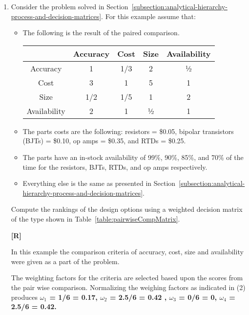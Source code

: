 \begin{enumerate}
\item
  Consider the problem solved in 
  Section~\ref{subsection:analytical-hierarchy-process-and-decision-matrices}. 
  For this example assume   that:
\begin{itemize}

\item
  The following is the result of the paired comparison.

\begin{table}
\begin{tabular}{|c|c|c|c|c|}
\hline
              &
Accuracy &
Cost &
Size &
Availability \\ \hline
Accuracy & 1 & 1/3 & 2 & ½ \\ \hline
Cost & 3 & 1 & 5 & 1 \\ \hline
Size & 1/2 & 1/5 & 1 & 2 \\ \hline
Availability & 2 & 1 & ½ & 1 \\ \hline
\end{tabular}
\end{table}


\item
  The parts costs are the following: resistors = \$0.05, bipolar
  transistors (BJTs) = \$0.10, op amps = \$0.35, and RTDs = \$0.25.
\item
  The parts have an in-stock availability of 99\%, 90\%, 85\%, and 70\%
  of the time for the re­sistors, BJTs, RTDs, and op amps respectively.
\item
  Everything else is the same as presented in 
  Section~\ref{subsection:analytical-hierarchy-process-and-decision-matrices}.
\end{itemize}

Compute the rankings of the design options using a weighted decision
matrix of the type shown in Table~\ref{table:pairwiseCompMatrix}.

  \begin{onlysolution}
    \textbf{[R]}
    \itshape
    
    In this example the comparison criteria of accuracy, cost, size and 
    availability were given as a part of the problem.
    
    The weighting factors for the criteria are selected based upon the 
    scores from the pair wise comparison. Normalizing the weighing factors 
    as indicated in (2) produces \textbf{$\omega_1$ = 1/6 = 0.17, $\omega_2$ = 2.5/6 = 0.42
    , $\omega_3$ = 0/6 = 0, $\omega_4$ = 2.5/6 = 0.42.} 
    

\end{onlysolution}
\end{enumerate}
